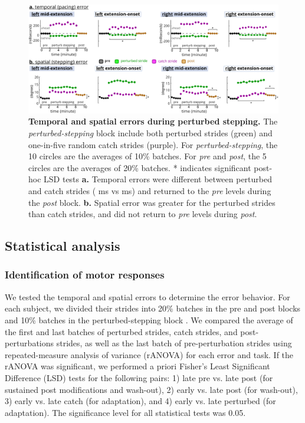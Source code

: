 \documentclass[../thesis_seyed.tex]{subfiles}
\begin{document}
\begin{figure}[!ht]
\centerline{\includegraphics{../img/04_error-result-tnsreR1.jpg}}
\caption{\textbf{Temporal and spatial errors during perturbed stepping.} The \textit{perturbed-stepping} block include both perturbed strides (green) and one-in-five random catch strides (purple). {For \textit{perturbed-stepping}, the 10 circles are the averages of 10\% batches. For \textit{pre} and \textit{post}, the 5 circles are the averages of 20\% batches. * indicates significant post-hoc LSD tests} \textbf{a.} Temporal errors were different between perturbed and catch strides ( ms vs  ms) and returned to the \textit{pre} levels during the \textit{post} block. \textbf{b.} Spatial error was greater for the perturbed strides than catch strides, and did not return to \textit{pre} levels during \textit{post}.}
\label{fig:fig4}
\end{figure}

\subsection{Statistical analysis}
\subsubsection{Identification of motor responses}
{We tested the temporal and spatial errors to determine the error behavior. For each subject, we divided their strides into 20\% batches in the pre and post blocks and 10\% batches in the perturbed-stepping block} \cite{Van_Leeuwen2019-zb}{. We compared the average of the first and last batches of perturbed strides, catch strides, and post-perturbations strides, as well as the last batch of pre-perturbation strides using repeated-measure analysis of variance (rANOVA) for each error and task. If the rANOVA was significant, we performed a priori Fisher's Least Significant Difference (LSD) tests for the following pairs: 1) late pre vs. late post (for sustained post modifications and wash-out), 2) early vs. late post (for wash-out), 3) early vs. late catch (for adaptation), and 4) early vs. late perturbed (for adaptation). The significance level for all statistical tests was 0.05.}  
\end{document}
